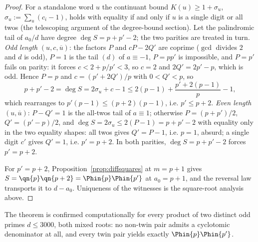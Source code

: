 \begin{proof}
 For a standalone word $u$ the
continuant bound $K(u)\ge1+\sigma_u$, $\sigma_u:=\sum_u(c_i-1)$, holds with
equality if and only if $u$ is a single digit or all twos (the telescoping
argument of the degree-bound section). Let the palindromic tail of $a_0/d$
have degree $\deg S=p+p'-2$; the two parities are treated in turn.
\emph{Odd length} $(u,c,\overline u)$: the factors $P$ and $cP-2Q'$ are
coprime ($\gcd$ divides $2$ and $d$ is odd), $P=1$ is the tail $(d)$ of
$a\equiv-1$, $P=pp'$ is impossible, and $P=p'$ fails on parity: it forces
$c<2+p/p'<3$, so $c=2$ and $2Q'=2p'-p$, which is odd. Hence $P=p$ and
$c=(p'+2Q')/p$ with $0<Q'<p$, so
\[
  p+p'-2=\deg S=2\sigma_u+c-1\le2(p-1)+\frac{p'+2(p-1)}{p}-1,
\]
which rearranges to $p'(p-1)\le(p+2)(p-1)$, i.e. $p'\le p+2$.
\emph{Even length} $(u,\overline u)$: $P-Q'=1$ is the all-twos tail of
$a\equiv1$; otherwise $P=(p+p')/2$, $Q'=(p'-p)/2$, and
$\deg S=2\sigma_u\le2(P-1)=p+p'-2$ with equality only in the two equality
shapes: all twos gives $Q'=P-1$, i.e. $p=1$, absurd; a single digit $c'$ gives
$Q'=1$, i.e. $p'=p+2$. In both parities, $\deg S=p+p'-2$ forces $p'=p+2$.

 For $p'=p+2$, Proposition~\ref{prop:diffsquares} at
$m=p+1$ gives $S=\qn{p}\qn{p+2}=\Phin{p}\Phin{p'}$ at $a_0=p+1$, and the
reversal law transports it to $d-a_0$. Uniqueness of the witnesses is the
square-root analysis above.
\end{proof}

\noindent The theorem is confirmed computationally for every product of two
distinct odd primes $d\le3000$, both mixed roots: no non-twin pair admits a
cyclotomic denominator at all, and every twin pair yields exactly
$\Phin{p}\Phin{p'}$.
